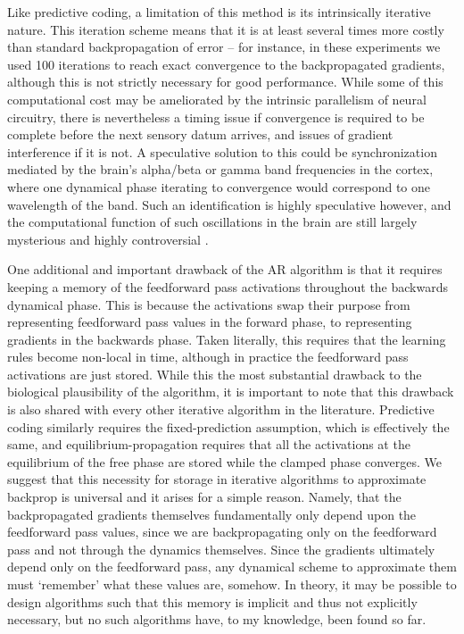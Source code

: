 Like predictive coding, a limitation of this method is its intrinsically iterative nature. This iteration scheme means that it is at least several times more costly than standard backpropagation of error -- for instance, in these experiments we used 100 iterations to reach exact convergence to the backpropagated gradients, although this is not strictly necessary for good performance. While some of this computational cost may be ameliorated by the intrinsic parallelism of neural circuitry, there is nevertheless a timing issue if convergence is required to be complete before the next sensory datum arrives, and issues of gradient interference if it is not. A speculative solution to this could be synchronization mediated by the brain's alpha/beta or gamma band frequencies in the cortex, where one dynamical phase iterating to convergence would correspond to one wavelength of the band. Such an identification is highly speculative however, and the computational function of such oscillations in the brain are still largely mysterious and highly controversial \citep{buzsaki2006rhythms}.

One additional and important drawback of the AR algorithm is that it requires keeping a memory of the feedforward pass activations throughout the backwards dynamical phase. This is because the activations swap their purpose from representing feedforward pass values in the forward phase, to representing gradients in the backwards phase. Taken literally, this requires that the learning rules become non-local in time, although in practice the feedforward pass activations are just stored. While this the most substantial drawback to the biological plausibility of the algorithm, it is important to note that this drawback is also shared with every other iterative algorithm in the literature. Predictive coding similarly requires the fixed-prediction assumption, which is effectively the same, and equilibrium-propagation requires that all the activations at the equilibrium of the free phase are stored while the clamped phase converges. We suggest that this necessity for storage in iterative algorithms to approximate backprop is universal and it arises for a simple reason. Namely, that the backpropagated gradients themselves fundamentally only depend upon the feedforward pass values, since we are backpropagating only on the feedforward pass and not through the dynamics themselves. Since the gradients ultimately depend only on the feedforward pass, any dynamical scheme to approximate them must `remember' what these values are, somehow. In theory, it may be possible to design algorithms such that this memory is implicit and thus not explicitly necessary, but no such algorithms have, to my knowledge, been found so far.

